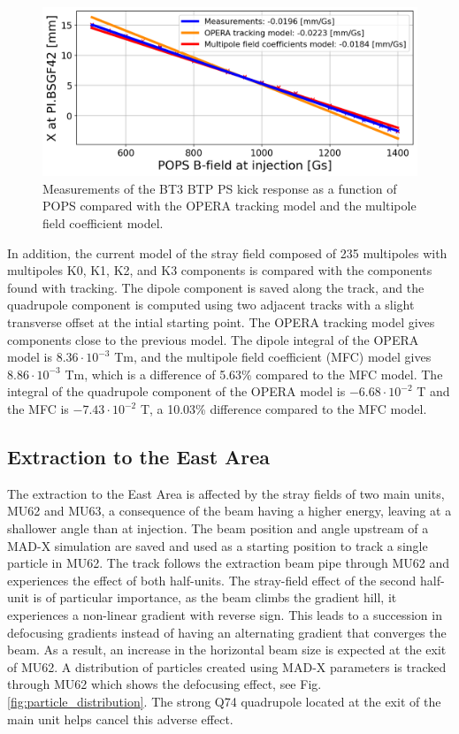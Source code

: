 \documentclass[a4paper,
               biblatex,     %
               keeplastbox,   %
               ]{jacow}
\begin{document}
\begin{figure}[!htb]
   \centering
   \includegraphics*[width=1.0\columnwidth]{transverse_position_vs_POPS}
   \caption{Measurements of the BT3 BTP PS kick response as a function of POPS compared with the OPERA tracking model and the multipole field coefficient model.}
   \label{fig:injection_btp_transverse_position}
\end{figure}

In addition, the current model of the stray field composed of 235 multipoles with multipoles K0, K1, K2, and K3 components is compared with the components found with tracking. The dipole component is saved along the track, and the quadrupole component is computed using two adjacent tracks with a slight transverse offset at the intial starting point. The OPERA tracking model gives components close to the previous model. The dipole integral of the OPERA model is $8.36\cdot10^{-3}$ Tm, and the multipole field coefficient (MFC) model gives $8.86\cdot10^{-3}$ Tm, which is a difference of 5.63\% compared to the MFC model. The integral of the quadrupole component of the OPERA model is $-6.68\cdot10^{-2}$ T and the MFC is $-7.43\cdot10^{-2}$ T, a 10.03\% difference compared to the MFC model.


\subsection{Extraction to the East Area}
The extraction to the East Area is affected by the stray fields of two main units, MU62 and MU63, a consequence of the beam having a higher energy, leaving at a shallower angle than at injection. The beam position and angle upstream of a MAD-X simulation are saved and used as a starting position to track a single particle in MU62. The track follows the extraction beam pipe through MU62 and experiences the effect of both half-units. The stray-field effect of the second half-unit is of particular importance, as the beam climbs the gradient hill, it experiences a non-linear gradient with reverse sign. This leads to a succession in defocusing gradients instead of having an alternating gradient that converges the beam. As a result, an increase in the horizontal beam size is expected at the exit of MU62. A distribution of particles created using MAD-X parameters is tracked through MU62 which shows the defocusing effect, see Fig. \ref{fig:particle_distribution}. The strong Q74 quadrupole located at the exit of the main unit helps cancel this adverse effect.
\end{document}

